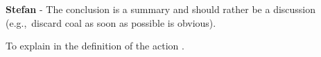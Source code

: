 \documentclass[12pt,a4paper]{article}
\def\eg{e.g.,\ }
\begin{document}
\noindent 

\begin{mdframed}[style=manuscript] %

\end{mdframed}

\begin{mdframed}[style=comment] %
{\color{teal} \textbf{Stefan}} - The conclusion is a summary and should rather be a discussion (\eg discard coal as soon as possible is obvious).
\end{mdframed}

\noindent To explain in the definition of the action {\color{blue} }. 

\begin{mdframed}[style=manuscript] %

\end{mdframed}


\clearpage
\def\bibfont{\scriptsize}

\normalsize
\end{document}
